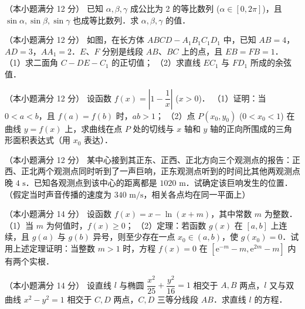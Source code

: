 \begin{question}
（本小题满分 12 分）
已知 $\alpha, \beta, \gamma$ 成公比为 2 的等比数列 ($\alpha \in [0, 2\pi]$)，且 $\sin\alpha, \sin\beta, \sin\gamma$ 也成等比数列．求 $\alpha, \beta, \gamma$ 的值．

\Needspace{0.4\textheight}
\end{question}
\begin{question}
（本小题满分 12 分）
如图，在长方体 $ABCD - A_1B_1C_1D_1$ 中，已知 $AB = 4$，$AD = 3$，$AA_1 = 2$．$E$、$F$ 分别是线段 $AB$、$BC$ 上的点，且 $EB = FB = 1$．
（1）求二面角 $C - DE - C_1$ 的正切值；
（2）求直线 $EC_1$ 与 $FD_1$ 所成的余弦值．
\nopagebreak[4]
\begin{center}\end{center}
\nopagebreak[4]
\end{question}
\begin{question}
（本小题满分 12 分）
设函数 $f(x) = \left| 1 - \dfrac{1}{x} \right|$ ($x > 0$)．
（1）证明：当 $0 < a < b$，且 $f(a) = f(b)$ 时，$ab > 1$；
（2）点 $P(x_0, y_0)$ ($0 < x_0 < 1$) 在曲线 $y = f(x)$ 上，求曲线在点 $P$ 处的切线与 $x$ 轴和 $y$ 轴的正向所围成的三角形面积表达式（用 $x_0$ 表达）．

\end{question}
\begin{question}
（本小题满分 12 分）
某中心接到其正东、正西、正北方向三个观测点的报告：正西、正北两个观测点同时听到了一声巨响，正东观测点听到的时间比其他两观测点晚 $4\text{ s}$．已知各观测点到该中心的距离都是 $1020\text{ m}$．试确定该巨响发生的位置．（假定当时声音传播的速度为 $340\text{ m/s}$，相关各点均在同一平面上）

\end{question}
\begin{question}
（本小题满分 14 分）
设函数 $f(x) = x - \ln(x + m)$，其中常数 $m$ 为整数．
（1）当 $m$ 为何值时，$f(x) \geqslant 0$；
（2）定理：若函数 $g(x)$ 在 $[a, b]$ 上连续，且 $g(a)$ 与 $g(b)$ 异号，则至少存在一点 $x_0 \in (a, b)$，使 $g(x_0) = 0$．试用上述定理证明：当整数 $m > 1$ 时，方程 $f(x) = 0$ 在 $[\mathrm{e}^{-m} - m, \mathrm{e}^{2m} - m]$ 内有两个实根．

\end{question}
\begin{question}
（本小题满分 14 分）
设直线 $l$ 与椭圆 $\dfrac{x^2}{25} + \dfrac{y^2}{16} = 1$ 相交于 $A, B$ 两点，$l$ 又与双曲线 $x^2 - y^2 = 1$ 相交于 $C, D$ 两点，$C, D$ 三等分线段 $AB$．求直线 $l$ 的方程．

\end{question}
